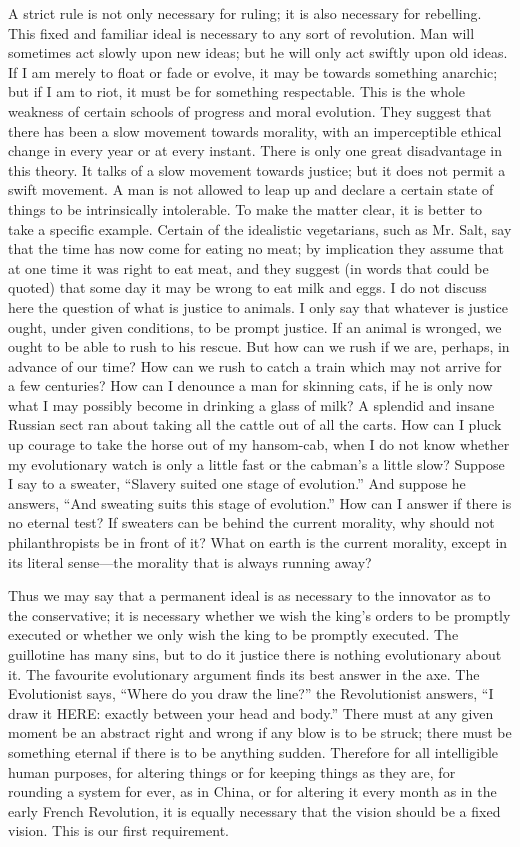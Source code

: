 A strict rule is not only necessary for ruling; it is also necessary for rebelling. This fixed and familiar ideal is necessary to any sort of revolution. Man will sometimes act slowly upon new ideas; but he will only act swiftly upon old ideas. If I am merely to float or fade or evolve, it may be towards something anarchic; but if I am to riot, it must be for something respectable. This is the whole weakness of certain schools of progress and moral evolution. They suggest that there has been a slow movement towards morality, with an imperceptible ethical change in every year or at every instant. There is only one great disadvantage in this theory. It talks of a slow movement towards justice; but it does not permit a swift movement. A man is not allowed to leap up and declare a certain state of things to be intrinsically intolerable. To make the matter clear, it is better to take a specific example. Certain of the idealistic vegetarians, such as Mr. Salt, say that the time has now come for eating no meat; by implication they assume that at one time it was right to eat meat, and they suggest (in words that could be quoted) that some day it may be wrong to eat milk and eggs. I do not discuss here the question of what is justice to animals. I only say that whatever is justice ought, under given conditions, to be prompt justice. If an animal is wronged, we ought to be able to rush to his rescue. But how can we rush if we are, perhaps, in advance of our time? How can we rush to catch a train which may not arrive for a few centuries? How can I denounce a man for skinning cats, if he is only now what I may possibly become in drinking a glass of milk? A splendid and insane Russian sect ran about taking all the cattle out of all the carts. How can I pluck up courage to take the horse out of my hansom-cab, when I do not know whether my evolutionary watch is only a little fast or the cabman’s a little slow? Suppose I say to a sweater, “Slavery suited one stage of evolution.” And suppose he answers, “And sweating suits this stage of evolution.” How can I answer if there is no eternal test? If sweaters can be behind the current morality, why should not philanthropists be in front of it? What on earth is the current morality, except in its literal sense—the morality that is always running away?

Thus we may say that a permanent ideal is as necessary to the innovator as to the conservative; it is necessary whether we wish the king’s orders to be promptly executed or whether we only wish the king to be promptly executed. The guillotine has many sins, but to do it justice there is nothing evolutionary about it. The favourite evolutionary argument finds its best answer in the axe. The Evolutionist says, “Where do you draw the line?” the Revolutionist answers, “I draw it HERE: exactly between your head and body.” There must at any given moment be an abstract right and wrong if any blow is to be struck; there must be something eternal if there is to be anything sudden. Therefore for all intelligible human purposes, for altering things or for keeping things as they are, for rounding a system for ever, as in China, or for altering it every month as in the early French Revolution, it is equally necessary that the vision should be a fixed vision. This is our first requirement.

